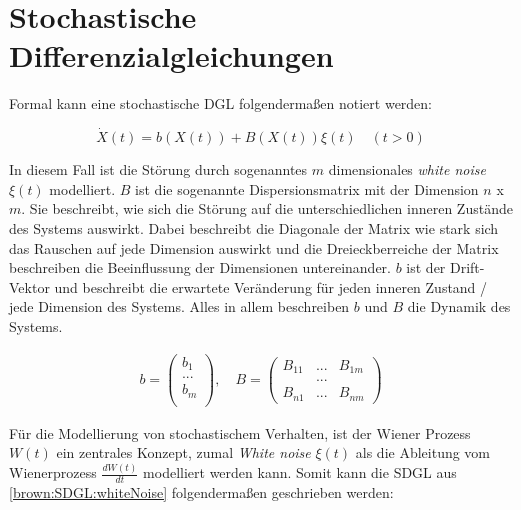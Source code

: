 %
%
%
%

\section{Stochastische Differenzialgleichungen\label{brown:SDGL}}

Formal kann eine stochastische DGL folgendermaßen notiert werden: 

\begin{equation}
	\label{brown:SDGL:whiteNoise}
	\dot{X}(t) = b(X(t)) + B(X(t))\xi(t) \quad (t>0)
\end{equation}

In diesem Fall ist die Störung durch sogenanntes $ m $ dimensionales \textit{white noise} $ \xi(t) $ modelliert.
$ B $ ist die sogenannte Dispersionsmatrix mit der Dimension $ n $ x $ m $. Sie beschreibt, wie sich die Störung auf die unterschiedlichen inneren Zustände des Systems auswirkt. Dabei beschreibt die Diagonale der Matrix wie stark sich das Rauschen auf jede Dimension auswirkt und die Dreieckberreiche der Matrix beschreiben die Beeinflussung der Dimensionen untereinander.
$ b $ ist der Drift-Vektor und beschreibt die erwartete Veränderung für jeden inneren Zustand / jede Dimension des Systems.
Alles in allem beschreiben $ b $ und $ B $ die Dynamik des Systems. 

\begin{align*}
	b = 
	\begin{pmatrix}
		b_{1} \\
		...\\
		b_{m}\\ 
	\end{pmatrix}
	, \quad
	B = 
	\begin{pmatrix}
		B_{11} & ... & B_{1m} \\
		& ... & \\
		B_{n1} & ... & B_{nm} 
	\end{pmatrix}
\end{align*}


Für die Modellierung von stochastischem Verhalten, ist der Wiener Prozess $ W(t) $ ein zentrales Konzept, zumal \textit{White noise} $ \xi(t) $ als die Ableitung vom Wienerprozess $ \frac{dW(t)}{dt} $ modelliert werden kann. Somit kann die SDGL aus \ref{brown:SDGL:whiteNoise} folgendermaßen geschrieben werden:


